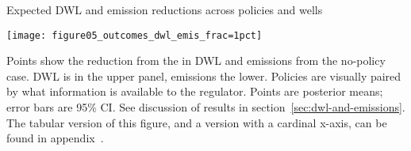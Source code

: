 \caption{Expected \gls{DWL} and emission reductions across policies and wells}

\label{fig:policy-outcomes-1pct}
\begin{center}
\texttt{[image: figure05\_outcomes\_dwl\_emis\_frac=1pct]}
\end{center}
Points show the reduction from the in \gls{DWL} and emissions from the no-policy case.
\gls{DWL} is in the upper panel, emissions the lower.
Policies are visually paired by what information is available to the regulator.
Points are posterior means; error bars are 95\% \gls{CI}.
See discussion of results in section~\ref{sec:dwl-and-emissions}.
The tabular version of this figure, and a version with a cardinal x-axis, can be found in appendix~\iftoggle{usexr}{\ref{app:tabular-policy-output}}{A4}.
